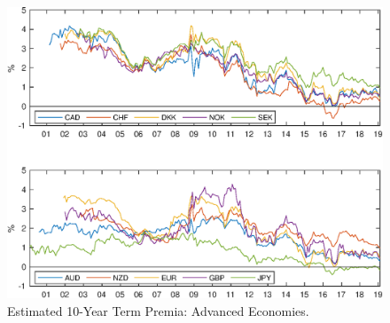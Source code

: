 	\begin{figure}[!htbp]
		\begin{centering}
			\includegraphics[width=1\textwidth,height=0.45\textheight]{../Figures/Temp/temp_tp10yrAE}
			\par\end{centering}
		\caption{Estimated 10-Year Term Premia: Advanced Economies.}\label{fig:temp_tp10yrAE}
	\end{figure}